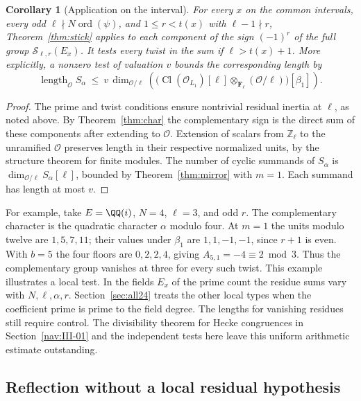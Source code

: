 \documentclass[a4paper,11pt]{article}
\newtheorem{corollary}[proposition]{Corollary}
\theoremstyle{definition}
\theoremstyle{remark}
\newcommand{\ZZ}{\mathbb Z}\newcommand{\ord}{\operatorname{ord}}
\newcommand{\len}{\operatorname{length}}\newcommand{\Res}{\operatorname*{Res}}
\numberwithin{equation}{section}
\newcommand{\Sel}{\mathcal S}
\newcommand{\Cl}{\operatorname{Cl}}
\newcommand{\OO}{\mathcal O}
\begin{document}
\begin{corollary}[Application on the interval]\label{cor:kill}
For every \(x\) on the common intervals, every odd \(\ell\nmid N\operatorname{ord}(\psi)\), and \(1\le r<t(x)\) with \(\ell-1\nmid r\), Theorem~\ref{thm:stick} applies to each component of the sign \((-1)^r\) of the full group \(\Sel_{\ell,r}(E_x)\). It tests every twist in the sum if \(\ell>t(x)+1\). More explicitly, a nonzero test of valuation \(v\) bounds the corresponding length by
\[
   \len_{\OO}S_\alpha\ \le\
   v\,\dim_{\OO/\ell}\!\left(\big(\Cl(\OO_{L_1})[\ell]\otimes_{\mathbf F_\ell}(\OO/\ell)\big)[\beta_1]\right).
\]
\end{corollary}
\begin{proof}
The prime and twist conditions ensure nontrivial residual inertia at \(\ell\), as noted above. By Theorem~\ref{thm:char} the complementary sign is the direct sum of these components after extending to \(\OO\). Extension of scalars from \(\ZZ_\ell\) to the unramified \(\OO\) preserves length in their respective normalized units, by the structure theorem for finite modules. The number of cyclic summands of \(S_\alpha\) is \(\dim_{\OO/\ell} S_\alpha[\ell]\), bounded by Theorem~\ref{thm:mirror} with \(m=1\). Each summand has length at most \(v\).
\end{proof}

For example, take \(E=\QQ(i)\), \(N=4\), \(\ell=3\), and odd \(r\). The complementary character is the quadratic character \(\alpha\) modulo four. At \(m=1\) the units modulo twelve are \(1,5,7,11\); their values under \(\beta_1\) are \(1,1,-1,-1\), since \(r+1\) is even. With \(b=5\) the four floors are \(0,2,2,4\), giving \(A_{5,1}=-4\equiv2\bmod3\). Thus the complementary group vanishes at three for every such twist. This example illustrates a local test. In the fields \(E_x\) of the prime count the residue sums vary with \(N,\ell,\alpha,r\). Section~\ref{sec:all24} treats the other local types when the coefficient prime is prime to the field degree. The lengths for vanishing residues still require control. The divisibility theorem for Hecke congruences in Section~\ref{nav:III-01} and the independent tests here leave this uniform arithmetic estimate outstanding.

\subsection{Reflection without a local residual hypothesis}\label{nav:III-04}
\label{sec:all24}
\end{document}
